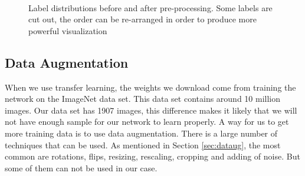 \begin{figure}
{\begin{subfigure}[b]{.65\textwidth}
\end{subfigure}%
}\\
\caption[Pre processing of labels]{Label distributions before and after pre-processing. Some labels are cut out,  the order can be re-arranged in order to produce more powerful visualization}
\label{fig:labelsdistrib}
\end{figure}

\subsection{Data Augmentation}
When we use transfer learning, the weights we download come from training the network on the ImageNet data set. This data set contains around 10 million images. Our data set has 1907 images, this difference makes it likely that we will not have enough sample for our network to learn properly. A way for us to get more training data is to use data augmentation.  There is a  large number of techniques that can be used. As mentioned in Section \ref{sec:dataug}, the most common are rotations, flips, resizing, rescaling, cropping and adding of noise. But some of them can not be used in our case. 

